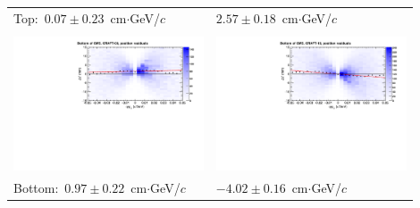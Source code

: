 \documentclass[compress]{beamer}
\begin{document}
\begin{frame}
\begin{tabular}{p{0.45\linewidth} p{0.45\linewidth}}
\small \mbox{Top: $0.07 \pm 0.23$~cm$\cdot$GeV/$c$\hspace{-1 cm}} & \small \hfill \mbox{$2.57 \pm 0.18$~cm$\cdot$GeV/$c$} \\
& \\
\includegraphics[width=\linewidth]{bfield_x_craft09_bottom.pdf} & \includegraphics[width=\linewidth]{bfield_x_craft10_bottom.pdf} \\
\small \mbox{Bottom: $0.97 \pm 0.22$~cm$\cdot$GeV/$c$\hspace{-1 cm}} & \small \hfill \mbox{$-4.02 \pm 0.16$~cm$\cdot$GeV/$c$} \\
\end{tabular}
\end{frame}
\end{document}
